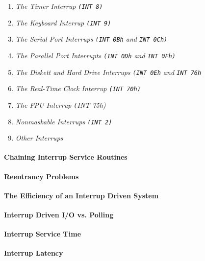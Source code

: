 \begin{enumerate}
    \item \textit{The Timer Interrup \texttt{(INT 8)}}
    \item \textit{The Keyboard Interrup \texttt{(INT 9)}}
    \item \textit{The Serial Port Interrups \texttt{(INT 0Bh} and \texttt{INT 0Ch)}}
    \item \textit{The Parallel Port Interrupts \texttt{(INT 0Dh} and \texttt{INT 0Fh)}}
    \item \textit{The Diskett and Hard Drive Interrups \texttt{(INT 0Eh} and \texttt{INT 76h}}
    \item \textit{The Real-Time Clock Interrup \texttt{(INT 70h)}}
    \item \textit{The FPU Interrup \texttt(INT 75h)}
    \item \textit{Nonmaskable Interrups \texttt{(INT 2)}}
    \item \textit{Other Interrups}
\end{enumerate}

\paragraph{\textnormal{\textbf{Chaining Interrup Service Routines}}}

\paragraph{\textnormal{\textbf{Reentrancy Problems}}}

\paragraph{\textnormal{\textbf{The Efficiency of an Interrup Driven System}}}

\paragraph{Interrup Driven I/O vs. Polling}

\paragraph{Interrup Service Time}

\paragraph{Interrup Latency}


